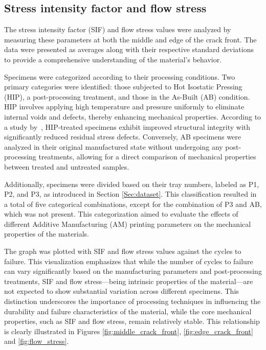 \documentclass{ieeeaccess}
\begin{document}
\subsection{Stress intensity factor and flow stress}
\label{Subsec: Stress intensity factor and flow stress}

The stress intensity factor (SIF) and flow stress values were analyzed by measuring these parameters at both the middle and edge of the crack front. The data were presented as averages along with their respective standard deviations to provide a comprehensive understanding of the material's behavior.

Specimens were categorized according to their processing conditions. Two primary categories were identified: those subjected to Hot Isostatic Pressing (HIP), a post-processing treatment, and those in the As-Built (AB) condition. HIP involves applying high temperature and pressure uniformly to eliminate internal voids and defects, thereby enhancing mechanical properties. According to a study by~\cite{leuders2013mechanical}, HIP-treated specimens exhibit improved structural integrity with significantly reduced residual stress defects. Conversely, AB specimens were analyzed in their original manufactured state without undergoing any post-processing treatments, allowing for a direct comparison of mechanical properties between treated and untreated samples.


Additionally, specimens were divided based on their tray numbers, labeled as P1, P2, and P3, as introduced in Section \ref{Sec:dataset}. This classification resulted in a total of five categorical combinations, except for the combination of P3 and AB, which was not present. This categorization aimed to evaluate the effects of different Additive Manufacturing (AM) printing parameters on the mechanical properties of the materials.

The graph was plotted with SIF and flow stress values against the cycles to failure. This visualization emphasizes that while the number of cycles to failure can vary significantly based on the manufacturing parameters and post-processing treatments, SIF and flow stress—being intrinsic properties of the material—are not expected to show substantial variation across different specimens. This distinction underscores the importance of processing techniques in influencing the durability and failure characteristics of the material, while the core mechanical properties, such as SIF and flow stress, remain relatively stable. This relationship is clearly illustrated in Figures \ref{fig:middle_crack_front}, \ref{fig:edge_crack_front} and \ref{fig:flow_stress}.
\end{document}
